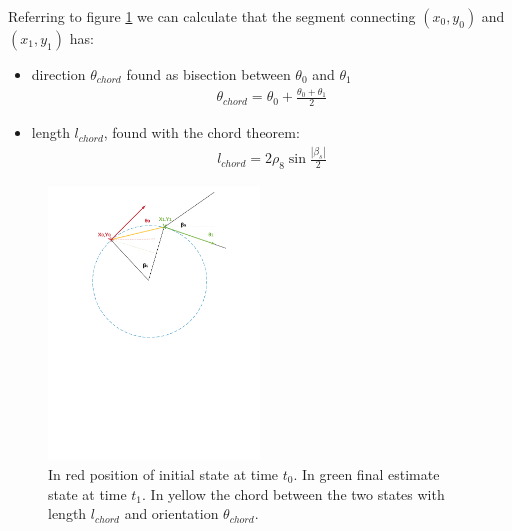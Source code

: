 \begin{itemize}
Referring to figure \ref{fig:chord} we can calculate that the segment connecting $(x_0,y_0)$ and $(x_1,y_1)$ has:
\begin{itemize}
\item direction $\theta_{chord}$ found as bisection between 
 $\theta_0$ and $\theta_1$
 \begin{align}
 \theta_{chord} = \theta_0 + \frac{\theta_0 + \theta_1}{2} 
 \label{eq:anglechord}
 \end{align}
\item length $l_{chord}$, found with the chord theorem:
\begin{align}
 l_{chord} = 2\rho_8\sin{\frac{|\beta_s|}{2}}
  \label{eq:lengthchord}
 \end{align}
\end{itemize}
\begin{figure}[!htbp]
    \centering
    \includegraphics[width=0.5\textwidth]{img/chord.pdf}
    \caption{In red position of initial state at time $t_0$. In green final estimate state at time $t_1$. In yellow the chord between the two states with length $l_{chord}$ and orientation $\theta_{chord}$.}
    \label{fig:chord}
\end{figure}


\end{itemize}
